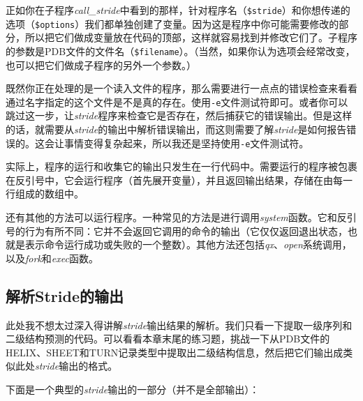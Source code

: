 

正如你在子程序\textit{call\_stride}中看到的那样，针对程序名（\verb|$stride|）和你想传递的选项（\verb|$options|）我们都单独创建了变量。因为这是程序中你可能需要修改的部分，所以把它们做成变量放在代码的顶部，这样就容易找到并修改它们了。子程序的参数是PDB文件的文件名（\verb|$filename|）。（当然，如果你认为选项会经常改变，也可以把它们做成子程序的另外一个参数。）

既然你正在处理的是一个读入文件的程序，那么需要进行一点点的错误检查来看看通过名字指定的这个文件是不是真的存在。使用\verb|-e|文件测试符即可。或者你可以跳过这一步，让\textit{stride}程序来检查它是否存在，然后捕获它的错误输出。但是这样的话，就需要从\textit{stride}的输出中解析错误输出，而这则需要了解\textit{stride}是如何报告错误的。这会让事情变得复杂起来，所以我还是坚持使用\verb|-e|文件测试符。

实际上，程序的运行和收集它的输出只发生在一行代码中。需要运行的程序被包裹在反引号中，它会运行程序（首先展开变量），并且返回输出结果，存储在由每一行组成的数组中。

还有其他的方法可以运行程序。一种常见的方法是进行调用\textit{system}函数。它和反引号的行为有所不同：它并不会返回它调用的命令的输出（它仅仅返回退出状态，也就是表示命令运行成功或失败的一个整数）。其他方法还包括\textit{qx}、\textit{open}系统调用，以及\textit{fork}和\textit{exec}函数。

\subsection{解析Stride的输出}
此处我不想太过深入得讲解\textit{stride}输出结果的解析。我们只看一下提取一级序列和二级结构预测的代码。可以看看本章末尾的练习题，挑战一下从PDB文件的HELIX、SHEET和TURN记录类型中提取出二级结构信息，然后把它们输出成类似此处\textit{stride}输出的格式。

下面是一个典型的\textit{stride}输出的一部分（并不是全部输出）：

